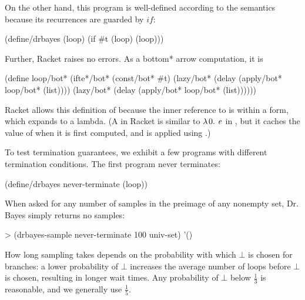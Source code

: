 On the other hand, this program is well-defined according to the semantics because its recurrences are guarded by $if$:
\begin{center}\singlespacing
\begin{schemedisplay}
(define/drbayes (loop) (if #t (loop) (loop)))
\end{schemedisplay}
\end{center}
Further, Racket raises no errors.
As a bottom* arrow computation, it is
\begin{center}\singlespacing
\begin{schemedisplay}
(define loop/bot*
  (ifte*/bot* (const/bot* #t)
              (lazy/bot* (delay (apply/bot* loop/bot* (list))))
              (lazy/bot* (delay (apply/bot* loop/bot* (list))))))
\end{schemedisplay}
\end{center}
Racket allows this definition of  because the inner reference to  is within a  form, which expands to a lambda.
(A  in Racket is similar to $\lambda\mspace{2mu}{0}\ldotp\, \mathit{e}$ in \lzfclang, but it caches the value of  when it is first computed, and is applied using .)

To test termination guarantees, we exhibit a few programs with different termination conditions.
The first program never terminates:
\begin{center}\singlespacing
\begin{schemedisplay}
(define/drbayes never-terminate (loop))
\end{schemedisplay}
\end{center}
When asked for any number of samples in the preimage of any nonempty set, Dr. Bayes simply returns no samples:
\begin{center}\singlespacing
\begin{schemedisplay}
> (drbayes-sample never-terminate 100 univ-set)
'()
\end{schemedisplay}
\end{center}
How long sampling takes depends on the probability with which $\bot$ is chosen for branches: a lower probability of $\bot$ increases the average number of loops before $\bot$ is chosen, resulting in longer wait times.
Any probability of $\bot$ below $\frac{1}{3}$ is reasonable, and we generally use $\frac{1}{5}$.

